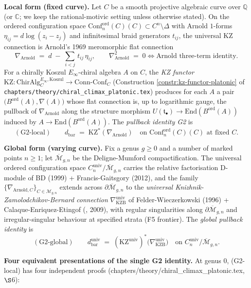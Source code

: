 \documentclass[12pt]{article}
\providecommand{\KZ}{\mathrm{KZ}}
\providecommand{\KZB}{\mathrm{KZB}}
\providecommand{\Arn}{\mathrm{Arnold}}
\providecommand{\Conf}{C}
\providecommand{\Confnord}[1][C]{\mathrm{Conf}_n^{\mathrm{ord}}(#1)}
\providecommand{\Mbar}{\overline{\mathcal{M}}}
\providecommand{\dbar}{d_{\mathrm{bar}}}
\providecommand{\BarOrd}{B^{\mathrm{ord}}}
\providecommand{\ChirAlg}{\mathrm{ChirAlg}}
\providecommand{\ConnConf}{\mathrm{Conn\text{-}Conf}}
\theoremstyle{definition}
\begin{document}
\textbf{Local form (fixed curve).}
Let $C$ be a smooth projective algebraic curve over $\mathbb{Q}$
(or $\mathbb{C}$; we keep the rational-motivic setting unless
otherwise stated).  On the ordered configuration space
$\Confnord(C) \subset C^{n} \setminus \Delta$ with Arnold
$1$\nobreakdash-forms
$\eta_{ij} = d\log(z_i - z_j)$
and infinitesimal braid generators $t_{ij}$, the universal KZ
connection is Arnold's 1969 meromorphic flat connection
\[
   \nabla_{\Arn}
   \;=\;
   d \;-\; \sum_{i < j}\,t_{ij}\,\eta_{ij},
   \qquad
   \nabla_{\Arn}^{2} \;=\; 0
   \iff
   \text{Arnold three-term identity}.
\]
For a chirally Koszul $E_\infty$-chiral algebra $A$ on $C$, the
\emph{KZ functor}
$\KZ \colon \ChirAlg^{E_\infty,\mathrm{Koszul}}_{C}
 \to \ConnConf_{C}$
(Construction \ref{constr:kz-functor-platonic}
of \texttt{chapters/theory/chiral\_climax\_platonic.tex})
produces for each $A$ a pair
$\bigl(\BarOrd(A),\nabla(A)\bigr)$ whose flat connection is, up
to logarithmic gauge, the pullback of $\nabla_{\Arn}$ along the
structure morphism $U(\mathfrak{t}_\bullet) \to \mathrm{End}(\BarOrd(A))$
induced by $A \to \mathrm{End}(\BarOrd(A))$.  The
\emph{pullback identity G2} is
\[
   (\text{G2-local})
   \qquad
   \dbar \;=\; \KZ^{*}(\nabla_{\Arn})
   \quad
   \text{on $\Confnord(C)$ at fixed $C$.}
\]

\textbf{Global form (varying curve).}
Fix a genus $g \geq 0$ and a number of marked points $n \geq 1$;
let $\Mbar_{g,n}$ be the Deligne-Mumford compactification.  The
universal ordered configuration space
$\Conf_n^{\mathrm{univ}} / \Mbar_{g,n}$ carries the relative
factorisation D-module of BD (1999) + Francis-Gaitsgory (2012),
and the family
$\{\nabla_{\Arn,C}\}_{C \in \mathcal{M}_{g,n}}$ extends across
$\partial \Mbar_{g,n}$ to the \emph{universal
Knizhnik-Zamolodchikov-Bernard connection}
$\nabla_{\KZB}^{\mathrm{univ}}$ of Felder-Wieczerkowski (1996) +
Calaque-Enriquez-Etingof (\cite{CEE09}, 2009), with regular
singularities along $\partial \Mbar_{g,n}$ and
irregular-singular behaviour at specified strata (F5 frontier).
The \emph{global pullback identity} is
\[
   (\text{G2-global})
   \qquad
   \dbar^{\mathrm{univ}} \;=\; (\KZ^{\mathrm{univ}})^{*}\bigl(\nabla_{\KZB}^{\mathrm{univ}}\bigr)
   \quad
   \text{on $\Conf_n^{\mathrm{univ}}/\Mbar_{g,n}$.}
\]

\textbf{Four equivalent presentations of the single G2 identity.}
At genus $0$, (G2-local) has four independent proofs
(chapters/theory/chiral\_climax\_platonic.tex, $\S$6):
\end{document}
